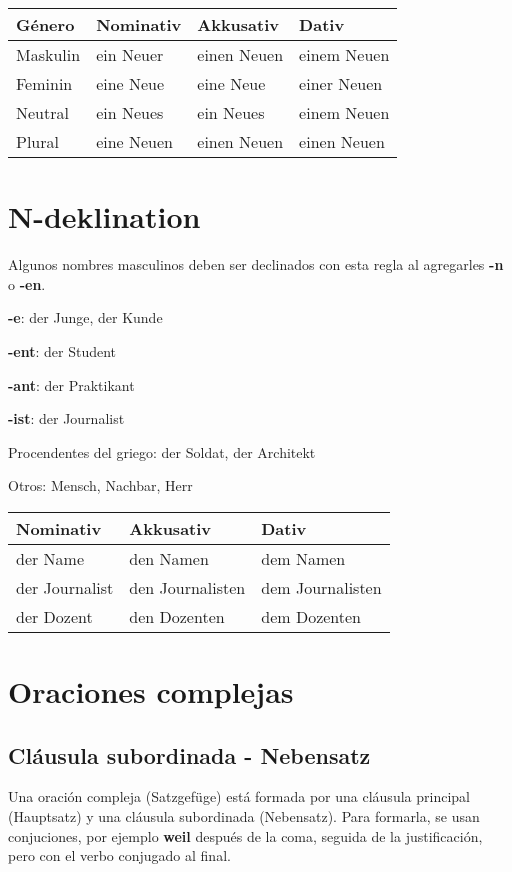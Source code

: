 \begin{tabular}{| l | l | l | l |}
\hline
\textbf{Género} & \textbf{Nominativ} & \textbf{Akkusativ} & \textbf{Dativ}\\
\hline
Maskulin & ein Neuer  &  einen Neuen & einem Neuen \\
Feminin  & eine Neue  &  eine Neue   & einer Neuen \\
Neutral  & ein Neues  &  ein Neues   & einem Neuen \\
Plural   & eine Neuen &  einen Neuen & einen Neuen \\
\hline
\end{tabular}

\section{N-deklination}

Algunos nombres masculinos deben ser declinados con esta regla al agregarles \textbf{-n} o \textbf{-en}.
\begin{myitemize}
\item \textbf{-e}: der Junge, der Kunde
\item \textbf{-ent}: der Student
\item \textbf{-ant}: der Praktikant
\item \textbf{-ist}: der Journalist
\item Procendentes del griego: der Soldat, der Architekt
\item Otros: Mensch, Nachbar, Herr
\end{myitemize}

\begin{tabular}{| l | l | l |}
\hline
\textbf{Nominativ} & \textbf{Akkusativ} & \textbf{Dativ}\\
\hline
der Name & den Namen & dem Namen \\
der Journalist & den Journalisten & dem Journalisten \\
der Dozent & den Dozenten & dem Dozenten \\
\hline
\end{tabular}

\section{Oraciones complejas}
\subsection{Cláusula subordinada - Nebensatz}
Una oración compleja (Satzgefüge) está formada por una cláusula principal (Hauptsatz) y una cláusula subordinada (Nebensatz). Para formarla, se usan conjuciones, por ejemplo \textbf{weil} después de la coma, seguida de la justificación, pero con el verbo conjugado al final.

